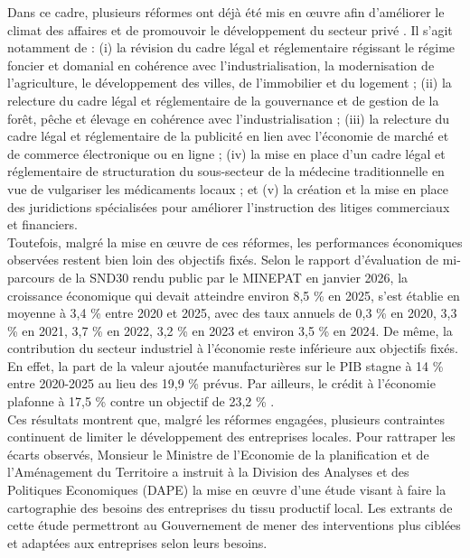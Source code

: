 \documentclass[12pt, a4paper, oneside]{report}
\begin{document}
	Dans ce cadre, plusieurs réformes ont déjà été mis en œuvre afin d’améliorer le climat des affaires et de promouvoir le développement du secteur privé \cite{minepat2025}. Il s’agit notamment de : (i) la révision du cadre légal et réglementaire régissant le régime foncier et domanial en cohérence avec l’industrialisation, la modernisation de l’agriculture, le développement des villes, de l’immobilier et du logement ; (ii) la relecture du cadre légal et réglementaire de la gouvernance et de gestion de la forêt, pêche et élevage en cohérence avec l’industrialisation ; (iii) la relecture du cadre légal et réglementaire de la publicité en lien avec l’économie de marché et de commerce électronique ou en ligne ; (iv) la mise en place d’un cadre légal et réglementaire de structuration du sous-secteur de la médecine traditionnelle en vue de vulgariser les médicaments locaux ; et (v) la création et la mise en place des juridictions spécialisées pour améliorer l’instruction des litiges commerciaux et financiers.\\
	
	Toutefois, malgré la mise en œuvre de ces réformes, les performances économiques observées restent bien loin  des objectifs fixés. Selon le rapport d’évaluation de mi-parcours de la SND30 rendu public par le MINEPAT en janvier 2026, la croissance économique qui devait atteindre environ 8,5 \% en 2025, s’est établie en moyenne à 3,4 \% entre 2020 et 2025, avec des taux annuels de 0,3 \% en 2020, 3,3 \% en 2021, 3,7 \% en 2022, 3,2 \% en 2023 et environ 3,5 \% en 2024. De même, la contribution du secteur industriel à l’économie reste inférieure aux objectifs fixés. En effet, la part de la valeur ajoutée manufacturières sur le PIB stagne à 14 \% entre 2020-2025 au lieu des 19,9 \% prévus. Par ailleurs, le crédit à l’économie plafonne à 17,5 \% contre un objectif de 23,2 \% \cite{minepat2025}. \\
	
	Ces résultats montrent que, malgré les réformes engagées, plusieurs contraintes continuent de limiter le développement des entreprises locales. Pour rattraper les écarts observés, Monsieur le Ministre de l’Economie de la planification et de l’Aménagement du Territoire a instruit à la Division des Analyses et des Politiques Economiques (DAPE) la mise en œuvre d’une étude visant à faire la cartographie des besoins des entreprises du tissu productif local. Les extrants de cette étude permettront au Gouvernement de mener des interventions plus ciblées et adaptées aux entreprises selon leurs besoins.
	
\end{document}
